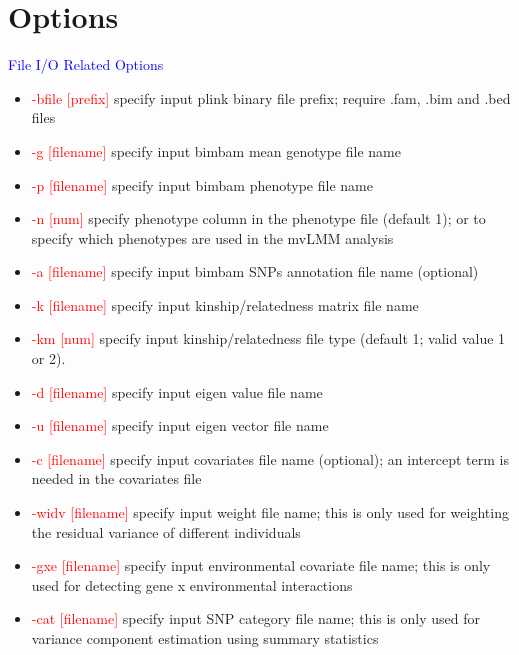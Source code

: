 \documentclass[11pt]{article}
\begin{document}
\clearpage
\newpage
\section{Options}

\textcolor{blue}{File I/O Related Options}
%
\begin{itemize}
\item \textcolor{red}{-bfile    [prefix]}          \quad specify input plink binary file prefix; require .fam, .bim and .bed files
\item \textcolor{red}{-g        [filename]}      \quad specify input bimbam mean genotype file name
\item  \textcolor{red}{-p        [filename]}      \quad specify input bimbam phenotype file name
\item  \textcolor{red}{-n        [num]}      \quad specify phenotype column in the phenotype file (default 1); or to specify which phenotypes are used in the mvLMM analysis
\item  \textcolor{red}{-a        [filename]}      \quad specify input bimbam SNPs annotation file name (optional)
\item  \textcolor{red}{ -k        [filename]}     \quad  specify input kinship/relatedness matrix file name
\item  \textcolor{red}{ -km       [num]}     \quad           specify input kinship/relatedness file type (default 1; valid value 1 or 2).
\item  \textcolor{red}{ -d        [filename]}     \quad  specify input eigen value file name
\item  \textcolor{red}{ -u        [filename]}     \quad  specify input eigen vector file name
\item  \textcolor{red}{ -c        [filename] }     \quad      specify input covariates file name (optional); an intercept term is needed in the covariates file
\item  \textcolor{red}{ -widv        [filename] }     \quad      specify input weight file name; this is only used for weighting the residual variance of different individuals
\item  \textcolor{red}{ -gxe        [filename] }     \quad      specify input environmental covariate file name; this is only used for detecting gene x environmental interactions
\item  \textcolor{red}{ -cat        [filename] }     \quad      specify input SNP category file name; this is only used for variance component estimation using summary statistics

\end{itemize}
\end{document}
